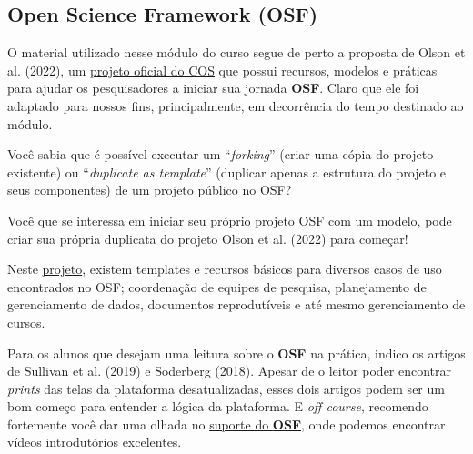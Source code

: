 \documentclass[
  a4paper,
]{article}
\begin{document}
\subsection{Open Science Framework
(OSF)}\label{open-science-framework-osf}

O material utilizado nesse módulo do curso segue de perto a proposta de
Olson et al. (2022), um \href{https://osf.io/yaqe8/}{projeto oficial do
COS} que possui recursos, modelos e práticas para ajudar os
pesquisadores a iniciar sua jornada \textbf{OSF}. Claro que ele foi
adaptado para nossos fins, principalmente, em decorrência do tempo
destinado ao módulo.

\begin{tcolorbox}[enhanced jigsaw, breakable, opacityback=0, left=2mm, colbacktitle=quarto-callout-tip-color!10!white, colframe=quarto-callout-tip-color-frame, coltitle=black, title=\textcolor{quarto-callout-tip-color}{\faLightbulb}\hspace{0.5em}{Bifurcando ou duplicando um projeto}, titlerule=0mm, leftrule=.75mm, arc=.35mm, colback=white, bottomtitle=1mm, toptitle=1mm, toprule=.15mm, bottomrule=.15mm, rightrule=.15mm, opacitybacktitle=0.6]

Você sabia que é possível executar um ``\emph{forking}'' (criar uma
cópia do projeto existente) ou ``\emph{duplicate as template}''
(duplicar apenas a estrutura do projeto e seus componentes) de um
projeto público no OSF?

Você que se interessa em iniciar seu próprio projeto OSF com um modelo,
pode criar sua própria duplicata do projeto Olson et al. (2022) para
começar!

Neste \href{https://osf.io/yaqe8/}{projeto}, existem templates e
recursos básicos para diversos casos de uso encontrados no OSF;
coordenação de equipes de pesquisa, planejamento de gerenciamento de
dados, documentos reprodutíveis e até mesmo gerenciamento de cursos.

\end{tcolorbox}

Para os alunos que desejam uma leitura sobre o \textbf{OSF} na prática,
indico os artigos de Sullivan et al. (2019) e Soderberg (2018). Apesar
de o leitor poder encontrar \emph{prints} das telas da plataforma
desatualizadas, esses dois artigos podem ser um bom começo para entender
a lógica da plataforma. E \emph{off course}, recomendo fortemente você
dar uma olhada no
\href{https://help.osf.io/article/342-getting-started-on-the-osf}{suporte
do \textbf{OSF}}, onde podemos encontrar vídeos introdutórios
excelentes.
\end{document}
